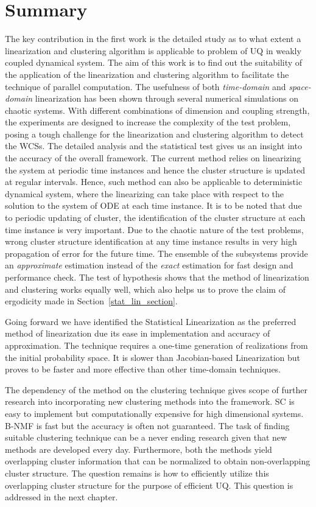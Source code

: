 \section{Summary}

The key contribution in the first work is the detailed study as to what extent a linearization and clustering algorithm is applicable to problem of UQ in weakly coupled dynamical system. The aim of this work is to find out the suitability of the application of the linearization and clustering algorithm to facilitate the technique of parallel computation. The usefulness of both \textit{time-domain} and \textit{space-domain} linearization has been shown through several numerical simulations on chaotic systems. With different combinations of dimension and coupling strength, the experiments are designed to increase the complexity of the test problem, posing a tough challenge for the linearization and clustering algorithm to detect the WCSs. The detailed analysis and the statistical test gives us an insight into the accuracy of the overall framework. The current method relies on linearizing the system at periodic time instances and hence the cluster structure is updated at regular intervals. Hence, such method can also be applicable to deterministic dynamical system, where the linearizing can take place with respect to the solution to the system of ODE at each time instance. It is to be noted that due to periodic updating of cluster, the identification of the cluster structure at each time instance is very important. Due to the chaotic nature of the test problems, wrong cluster structure identification at any time instance results in very high propagation of error for the future time. The ensemble of the subsystems provide an \textit{approximate} estimation instead of the \textit{exact} estimation for fast design and performance check. The test of hypothesis shows that the method of linearization and clustering works equally well, which also helps us to prove the claim of ergodicity made in Section~\ref{stat_lin_section}.

Going forward we have identified the Statistical Linearization as the preferred method of linearization due its ease in implementation and accuracy of approximation. The technique requires a one-time generation of realizations from the initial probability space. It is slower than Jacobian-based Linearization but proves to be faster and more effective than other time-domain techniques. 

The dependency of the method on the clustering technique gives scope of further research into incorporating new clustering methods into the framework. SC is easy to implement but computationally expensive for high dimensional systems. B-NMF is fast but the accuracy is often not guaranteed. The task of finding suitable clustering technique can be a never ending research given that new methods are developed every day. Furthermore, both the methods yield overlapping cluster information that can be normalized to obtain non-overlapping cluster structure. The question remains is how to efficiently utilize this overlapping cluster structure for the purpose of efficient UQ. This question is addressed in the next chapter.